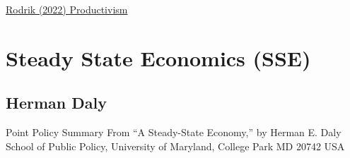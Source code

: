 \documentclass[
]{book}
\begin{document}
\href{https://www.project-syndicate.org/commentary/new-productivism-economic-policy-paradigm-by-dani-rodrik-2022-07}{Rodrik (2022) Productivism}

\hypertarget{steady-state-economics-sse}{%
\chapter{Steady State Economics (SSE)}\label{steady-state-economics-sse}}

\hypertarget{herman-daly}{%
\section{Herman Daly}\label{herman-daly}}

Point Policy Summary
From ``A Steady-State Economy,'' by Herman E. Daly
School of Public Policy, University of Maryland, College Park MD 20742 USA
\end{document}
